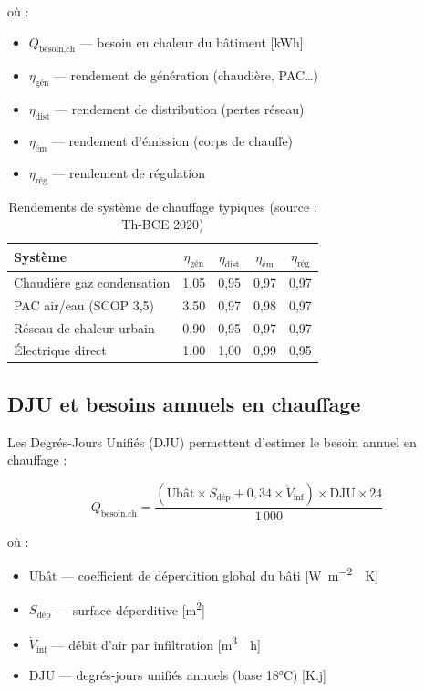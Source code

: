 où :
\begin{itemize}
  \item $Q_{\text{besoin,ch}}$ — besoin en chaleur du bâtiment [\si{\kWh}]
  \item $\eta_{\text{gén}}$ — rendement de génération (chaudière, PAC…)
  \item $\eta_{\text{dist}}$ — rendement de distribution (pertes réseau)
  \item $\eta_{\text{ém}}$ — rendement d'émission (corps de chauffe)
  \item $\eta_{\text{rég}}$ — rendement de régulation
\end{itemize}

\begin{table}[H]
  \centering
  \begin{tabular}{lcccc}
    \toprule
    Système & $\eta_{\text{gén}}$ & $\eta_{\text{dist}}$ & $\eta_{\text{ém}}$ & $\eta_{\text{rég}}$ \\
    \midrule
    Chaudière gaz condensation & 1,05 & 0,95 & 0,97 & 0,97 \\
    PAC air/eau (SCOP 3,5) & 3,50 & 0,97 & 0,98 & 0,97 \\
    Réseau de chaleur urbain & 0,90 & 0,95 & 0,97 & 0,97 \\
    Électrique direct & 1,00 & 1,00 & 0,99 & 0,95 \\
    \bottomrule
  \end{tabular}
  \caption{Rendements de système de chauffage typiques (source : Th-BCE 2020)}
\end{table}

\subsection{DJU et besoins annuels en chauffage}

Les Degrés-Jours Unifiés (DJU) permettent d'estimer le besoin annuel en chauffage :

\begin{equation}
  Q_{\text{besoin,ch}} = \frac{(\text{Ubât} \times S_{\text{dép}} + 0{,}34 \times \dot{V}_{\text{inf}}) \times \text{DJU} \times 24}{1\,000}
  \label{eq:besoin_dju}
\end{equation}

où :
\begin{itemize}
  \item $\text{Ubât}$ — coefficient de déperdition global du bâti [\si{\W \per \m^2 \per \kelvin}]
  \item $S_{\text{dép}}$ — surface déperditive [\si{\m^2}]
  \item $\dot{V}_{\text{inf}}$ — débit d'air par infiltration [\si{\m^3 \per \hour}]
  \item $\text{DJU}$ — degrés-jours unifiés annuels (base 18°C) [K.j]
\end{itemize}

